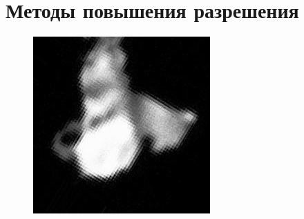 \newpage

\section{Методы повышения разрешения}

\begin{figure}[h!]
	\centering
	\begin{minipage}{.5\textwidth}
		\centering
		\includegraphics[width=0.2\linewidth]{inc/img/us_original}
		\label{fig:us_original}
	\end{minipage}%
\end{figure}

